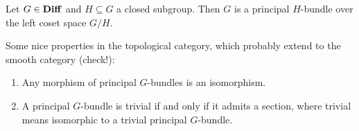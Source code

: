 \begin{exa}
    Let $G\in \mathbf{Diff}$ and $H\subseteq G$ a closed subgroup.
    Then $G$ is a principal $H$-bundle over the left coset space $G/H$.
\end{exa}

Some nice properties in the topological category, which probably extend to the smooth category (check!):

\begin{prop}
    \begin{enumerate}[label=\roman*)]
	\item Any morphism of principal $G$-bundles is an isomorphism.
	\item A principal $G$-bundle is trivial if and only if it admits a section, where trivial means isomorphic to a trivial principal $G$-bundle.
    \end{enumerate}
\end{prop}
